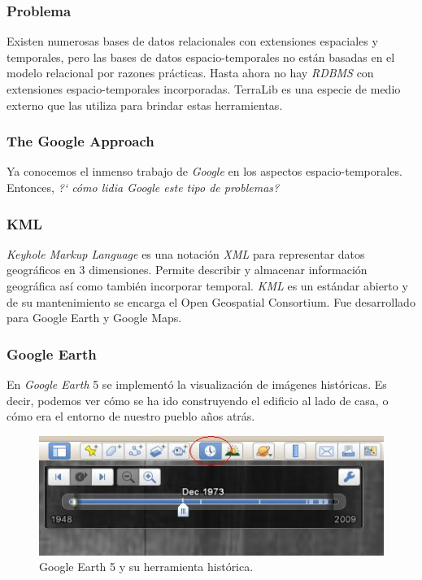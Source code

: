 \documentclass[a4paper,12pt,oneside]{report}
\begin{document}
\subsubsection*{Problema}
Existen numerosas bases de datos relacionales con extensiones espaciales y temporales, pero las bases de datos espacio-temporales no est\'an basadas en el modelo relacional por razones pr\'acticas. Hasta ahora no hay \textit{RDBMS} con extensiones espacio-temporales incorporadas. TerraLib es una especie de medio externo que las utiliza para brindar estas herramientas.

\subsubsection*{The Google Approach}
Ya conocemos el inmenso trabajo de \textit{Google} en los aspectos espacio-temporales. Entonces, \textit{?` c\'omo lidia Google este tipo de problemas?}
\subsubsection*{KML}
\textit{Keyhole Markup Language} es una notaci\'on \textit{XML} para representar datos geogr\'aficos en 3 dimensiones. Permite describir y almacenar informaci\'on geogr\'afica as\'i como tambi\'en incorporar temporal. \textit{KML} es un est\'andar abierto y de su mantenimiento se encarga el Open Geospatial Consortium. Fue desarrollado para Google Earth y Google Maps.

\subsubsection*{Google Earth}
En \textit{Google Earth} 5 se implement\'o la visualizaci\'on de im\'agenes hist\'oricas. Es decir, podemos ver c\'omo se ha ido construyendo el edificio al lado de casa, o c\'omo era el entorno de nuestro pueblo a\~nos atr\'as.

\begin{figure}[h]
\centering
\includegraphics[scale=0.6]{images/earth.jpg}
\caption{Google Earth 5 y su herramienta hist\'orica.}
\end{figure}
\end{document}
